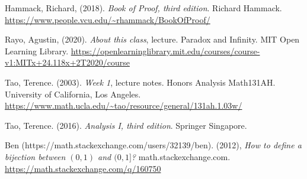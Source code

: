 \documentclass{article}[12pt]
\newcounter{question}
\newcommand\questionnum{\refstepcounter{question}\thequestion}
\newcommand{\R}{\mathbb{R}}
\begin{document}
    
    
    
    


    \begin{thebibliography}{9}
        
        Hammack, Richard, (2018). \emph{Book of Proof, third edition}. Richard Hammack. \url{https://www.people.vcu.edu/~rhammack/BookOfProof/}
        
        Rayo, Agustin, (2020). \emph{About this class}, lecture. Paradox and Infinity. MIT Open Learning Library. \url{https://openlearninglibrary.mit.edu/courses/course-v1:MITx+24.118x+2T2020/course}
        
        Tao, Terence. (2003). \emph{Week 1}, lecture notes. Honors Analysis Math131AH. University of California, Los Angeles. \url{https://www.math.ucla.edu/~tao/resource/general/131ah.1.03w/}
        
        Tao, Terence. (2016). \emph{Analysis I, third edition}. Springer Singapore.
        
        \bibitem{}
        Ben (https://math.stackexchange.com/users/32139/ben). (2012), \emph{How to define a bijection between $(0,1)$ and $(0,1]$?} math.stackexchange.com. \url{https://math.stackexchange.com/q/160750}

        
        
    \end{thebibliography}
    
    
\end{document}
